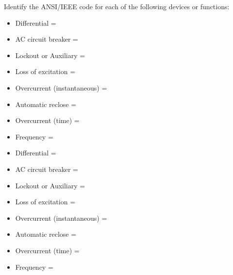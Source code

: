 

Identify the ANSI/IEEE code for each of the following devices or functions:

\vskip 10pt

\begin{itemize}
\item{} Differential = \underbar{\hskip 50pt}
\vskip 10pt
\item{} AC circuit breaker = \underbar{\hskip 50pt}
\vskip 10pt
\item{} Lockout or Auxiliary = \underbar{\hskip 50pt}
\vskip 10pt
\item{} Loss of excitation = \underbar{\hskip 50pt}
\vskip 10pt
\item{} Overcurrent (instantaneous) = \underbar{\hskip 50pt}
\vskip 10pt
\item{} Automatic reclose = \underbar{\hskip 50pt}
\vskip 10pt
\item{} Overcurrent (time) = \underbar{\hskip 50pt}
\vskip 10pt
\item{} Frequency = \underbar{\hskip 50pt}
\end{itemize}

\vskip 10pt







 






\begin{itemize}
\item{} Differential = 
\vskip 10pt
\item{} AC circuit breaker = 
\vskip 10pt
\item{} Lockout or Auxiliary = 
\vskip 10pt
\item{} Loss of excitation = 
\vskip 10pt
\item{} Overcurrent (instantaneous) = 
\vskip 10pt
\item{} Automatic reclose = 
\vskip 10pt
\item{} Overcurrent (time) = 
\vskip 10pt
\item{} Frequency = 
\end{itemize}




